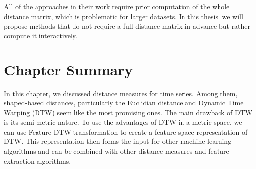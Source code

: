 All of the approaches in their work require prior computation of the whole distance matrix, which is problematic for larger datasets. In this thesis, we will propose methods that do not require a full distance matrix in advance but rather compute it interactively.

\section{Chapter Summary}

In this chapter, we discussed distance measures for time series. Among them, shaped-based distances, particularly the Euclidian distance and Dynamic Time Warping (DTW) seem like the most promising ones. The main drawback of DTW is its semi-metric nature. To use the advantages of DTW in a metric space, we can use Feature DTW transformation to create a feature space representation of DTW. This representation then forms the input for other machine learning algorithms and can be combined with other distance measures and feature extraction algorithms.